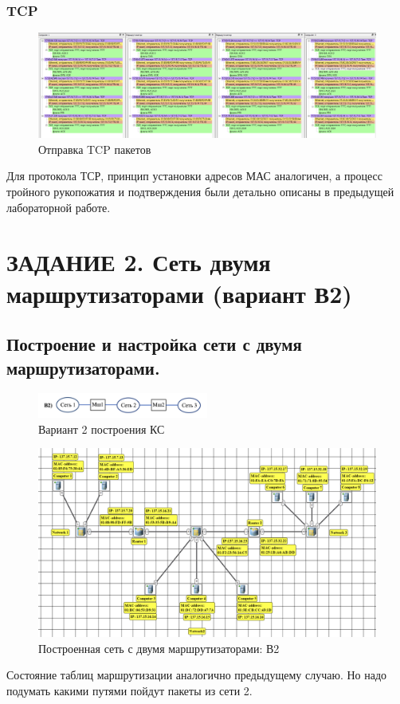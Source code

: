 \documentclass[12pt,onecolumn]{article}
\begin{document}
\subsubsection*{TCP}
\begin{figure}[H]
    \centering
    \includegraphics[width=\textwidth]{image/part-1/tcp.png}
    \caption{Отправка TCP пакетов}
\end{figure}
Для протокола ТСР, принцип установки адресов МАС аналогичен, а процесс тройного рукопожатия и подтверждения были детально описаны в предыдущей лабораторной работе.
\section{ЗАДАНИЕ 2. Сеть двумя маршрутизаторами (вариант В2)}
\subsection{Построение и настройка сети с двумя маршрутизаторами.}
\begin{figure}[H]
    \centering
    \includegraphics[width=0.5\textwidth]{image/part-2/task2.png}
    \caption{Вариант 2 построения КС}
\end{figure}
\begin{figure}[H]
    \centering
    \includegraphics[width=\textwidth]{image/part-2/net2.png}
    \caption{Построенная сеть с двумя маршрутизаторами: В2}
\end{figure}
Состояние таблиц маршрутизации аналогично предыдущему случаю. 
Но надо подумать какими путями пойдут пакеты из сети 2.
\end{document}
